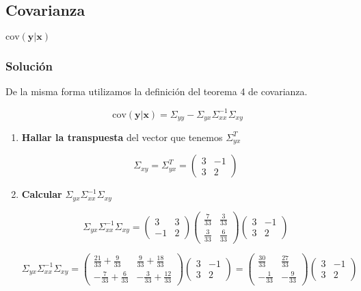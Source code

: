 
\subsection{Covarianza}

$\text{cov}(\mathbf{y}|\mathbf{x})$

\subsubsection{Solución}

De la misma forma utilizamos la definición del teorema 4 de covarianza.

$$\text{cov}(\mathbf{y}|\mathbf{x}) =
\Sigma_{yy} - \Sigma_{yx} \Sigma_{xx}^{-1} \Sigma_{xy}$$

\begin{enumerate}
    \item \textbf{Hallar la transpuesta} del vector que tenemos $\Sigma_{yx}^{T}$

    $$
    \Sigma_{xy} = \Sigma_{yx}^{T} =
    \begin{pmatrix}
    3 & -1 \\
    3 & 2
    \end{pmatrix}
    $$

    \item \textbf{Calcular }$\Sigma_{yx} \Sigma_{xx}^{-1} \Sigma_{xy}$

    $$
    \Sigma_{yx} \Sigma_{xx}^{-1} \Sigma_{xy} =
    \begin{pmatrix}
    3 & 3 \\
    -1 & 2
    \end{pmatrix}
    \begin{pmatrix}
    \frac{7}{33} & \frac{3}{33} \\
    \frac{3}{33} & \frac{6}{33}
    \end{pmatrix}
    \begin{pmatrix}
    3 & -1 \\
    3 & 2
    \end{pmatrix}
    $$

    $$
    \Sigma_{yx} \Sigma_{xx}^{-1} \Sigma_{xy} =
    \begin{pmatrix}
    \frac{21}{33}+\frac{9}{33} & \frac{9}{33}+\frac{18}{33} \\
    -\frac{7}{33}+\frac{6}{33} & -\frac{3}{33}+\frac{12}{33}
    \end{pmatrix}
    \begin{pmatrix}
    3 & -1 \\
    3 & 2
    \end{pmatrix} =
    \begin{pmatrix}
    \frac{30}{33} & \frac{27}{33} \\
    -\frac{1}{33} & -\frac{9}{33}
    \end{pmatrix}
    \begin{pmatrix}
    3 & -1 \\
    3 & 2
    \end{pmatrix}
    $$


\end{enumerate}
